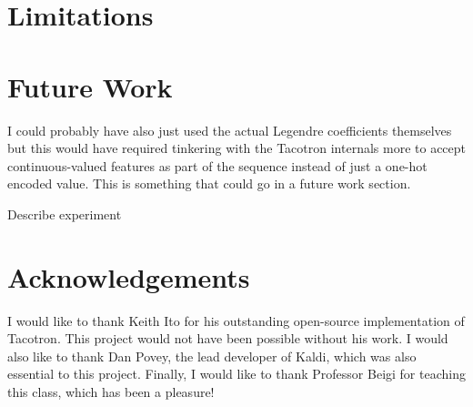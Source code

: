 \documentclass{article}
\begin{document}
\section{Limitations}

\section{Future Work}
\label{sec:futurework}

I could probably have also just used the actual Legendre coefficients themselves but this would have required tinkering with the Tacotron internals more to accept continuous-valued features as part of the sequence instead of just a one-hot encoded value. This is something that could go in a future work section.

Describe experiment

\section{Acknowledgements}
\label{sec:acknowledgements}
I would like to thank Keith Ito for his outstanding open-source implementation of Tacotron. This project would not have been possible without his work. I would also like to thank Dan Povey, the lead developer of Kaldi, which was also essential to this project. Finally, I would like to thank Professor Beigi for teaching this class, which has been a pleasure!

\vfill\pagebreak



\end{document}
